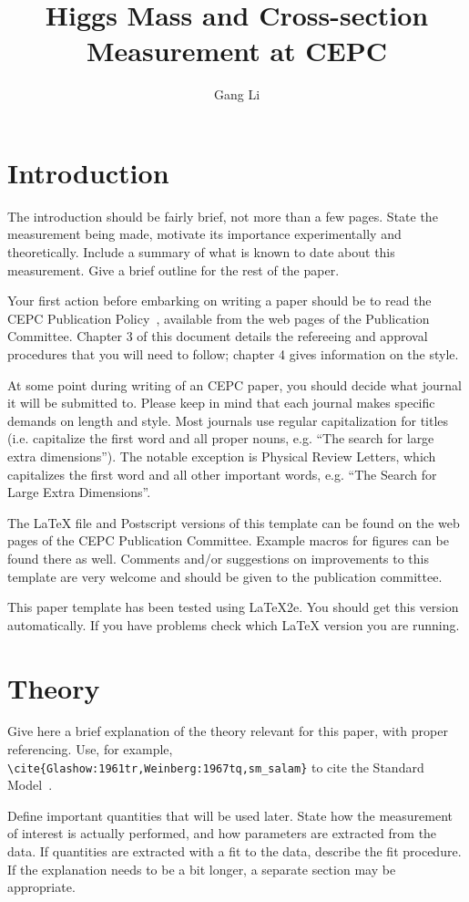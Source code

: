 \documentclass[11pt,a4paper]{cepcnote}
\title{ Higgs Mass and Cross-section Measurement at CEPC }
\author{Gang Li}
\begin{document}
\tableofcontents
\clearpage

\section{Introduction}

The introduction should be fairly brief, not more than a few pages.
State the measurement being made, motivate its importance
experimentally and theoretically. Include a summary of what is known
to date about this measurement. Give a brief outline for the rest of
the paper.

Your first action before embarking on writing a paper should be to
read the CEPC Publication Policy~\cite{publication_policy}, available
from the web pages of the Publication Committee. Chapter 3 of this
document details the refereeing and approval procedures that you will
need to follow; chapter 4 gives information on the style.

At some point during writing of an CEPC paper, you should decide what
journal it will be submitted to.  Please keep in mind that each
journal makes specific demands on length and style.  Most journals use
regular capitalization for titles (i.e. capitalize the first word and
all proper nouns, e.g. ``The search for large extra dimensions''). The
notable exception is Physical Review Letters, which capitalizes the
first word and all other important words, e.g. ``The Search for Large
Extra Dimensions''.

The \LaTeX{} file and Postscript versions of this template can be
found on the web pages of the CEPC Publication Committee. Example
macros for figures can be found there as well.  Comments and/or
suggestions on improvements to this template are very welcome and
should be given to the publication committee.

This paper template has been tested using \LaTeX{}2e.  You should get
this version automatically. If you have problems check which \LaTeX{}
version you are running.

\section{Theory}

Give here a brief explanation of the theory relevant for this paper,
with proper referencing. Use, for example,
\verb|\cite{Glashow:1961tr,Weinberg:1967tq,sm_salam}| to cite the
Standard Model~\cite{Glashow:1961tr,Weinberg:1967tq,sm_salam}.

Define important quantities that will be used later.  State how the
measurement of interest is actually performed, and how parameters are
extracted from the data.  If quantities are extracted with a fit to
the data, describe the fit procedure. If the explanation needs to be a
bit longer, a separate section may be appropriate.
\end{document}
